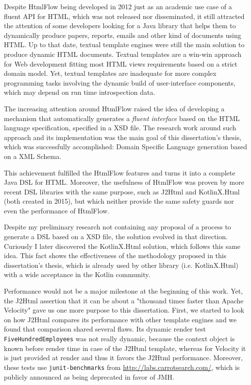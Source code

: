 \noindent
Despite HtmlFlow being developed in 2012 just as an academic use case of a fluent \ac{API} for \ac{HTML}, which was not released nor disseminated, it still attracted the attention of some developers looking for a Java library that helps them to dynamically produce papers, reports, emails and other kind of documents using \ac{HTML}. Up to that date, textual template engines were still the main solution to produce dynamic \ac{HTML} documents. Textual templates are a win-win approach for Web development fitting most \ac{HTML} views requirements based on a strict domain model. Yet, textual templates are inadequate for more complex programming tasks involving the dynamic build of user-interface components, which may depend on run time introspection data.

\noindent
The increasing attention around HtmlFlow raised the idea of developing a mechanism that automatically generates a \textit{fluent interface} based on the \ac{HTML} language specification, specified in a \ac{XSD} file. The research work around such approach and its implementation was the main goal of this dissertation's thesis, which was successfully accomplished: Domain Specific Language generation based on a XML Schema.

\noindent
This achievement fulfilled the HtmlFlow features and turns it into a complete Java \ac{DSL} for \ac{HTML}. Moreover, the usefulness of HtmlFlow was proven by more recent \ac{DSL} libraries with the same purpose, such as J2Html and KotlinX.Html (both created in 2015), but which neither provide the same safety guards nor even the performance of HtmlFlow. 

\noindent
Despite my preliminary research not containing any proposal of a process to generate a \ac{DSL} based on a \ac{XSD} file, the solution evolved in that direction. Curiously I later discovered the KotlinX.Html solution, which follows this same idea. This fact shows the effectiveness of the methodology proposed in this dissertation's thesis, which is already used by other library (i.e. KotlinX.Html) with a wide acceptance in the Kotlin community.

\noindent
Performance would not be a major milestone at the beginning of this work. Yet, the J2Html assertion that it can be about a "thousand times faster than Apache Velocity" gave us one more purpose to this dissertation. First, we started to look on how J2Html compares its performance with other template engines and we found that comparison shared several flaws. Its dynamic render test \texttt{FiveHundredEmployees} was not really dynamic, because the context object is known before render time in case of the J2Html template, whereas for Velocity it is just provided at render and thus it favors the J2Html performance. Moreover, these tests use \texttt{junit-benchmarks} from \url{http://labs.carrotsearch.com/}, which is publicly announced as being deprecated in favor of \ac{JMH}.

